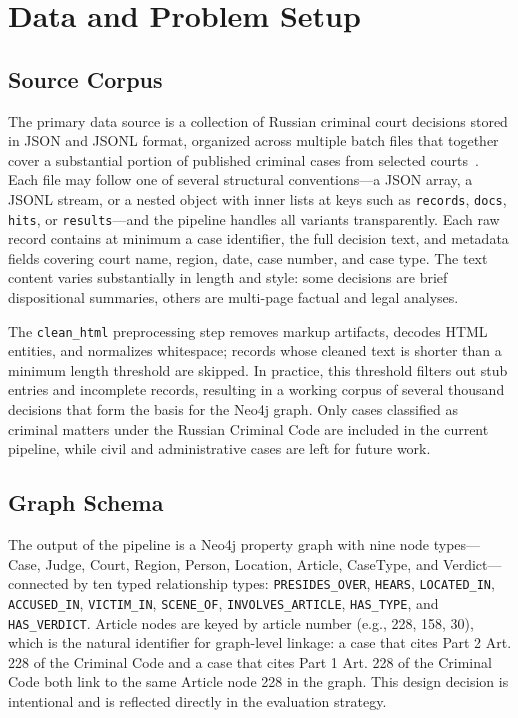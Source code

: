 \documentclass[11pt]{article}
\begin{document}
\section{Data and Problem Setup}

\subsection{Source Corpus}

The primary data source is a collection of Russian criminal court decisions stored in JSON and JSONL format, organized across multiple batch files that together cover a substantial portion of published criminal cases from selected courts~\cite{Metsker2019Procedia,Metsker2019Judgment}. Each file may follow one of several structural conventions---a JSON array, a JSONL stream, or a nested object with inner lists at keys such as \texttt{records}, \texttt{docs}, \texttt{hits}, or \texttt{results}---and the pipeline handles all variants transparently. Each raw record contains at minimum a case identifier, the full decision text, and metadata fields covering court name, region, date, case number, and case type. The text content varies substantially in length and style: some decisions are brief dispositional summaries, others are multi-page factual and legal analyses.

The \texttt{clean\_html} preprocessing step removes markup artifacts, decodes HTML entities, and normalizes whitespace; records whose cleaned text is shorter than a minimum length threshold are skipped. In practice, this threshold filters out stub entries and incomplete records, resulting in a working corpus of several thousand decisions that form the basis for the Neo4j graph. Only cases classified as criminal matters under the Russian Criminal Code are included in the current pipeline, while civil and administrative cases are left for future work.

\subsection{Graph Schema}

The output of the pipeline is a Neo4j property graph with nine node types---Case, Judge, Court, Region, Person, Location, Article, CaseType, and Verdict---connected by ten typed relationship types: \texttt{PRESIDES\_OVER}, \texttt{HEARS}, \texttt{LOCATED\_IN}, \texttt{ACCUSED\_IN}, \texttt{VICTIM\_IN}, \texttt{SCENE\_OF}, \texttt{INVOLVES\_ARTICLE}, \texttt{HAS\_TYPE}, and \texttt{HAS\_VERDICT}. Article nodes are keyed by article number (e.g., 228, 158, 30), which is the natural identifier for graph-level linkage: a case that cites Part 2 Art. 228 of the Criminal Code and a case that cites Part 1 Art. 228 of the Criminal Code both link to the same Article node 228 in the graph. This design decision is intentional and is reflected directly in the evaluation strategy.
\end{document}
